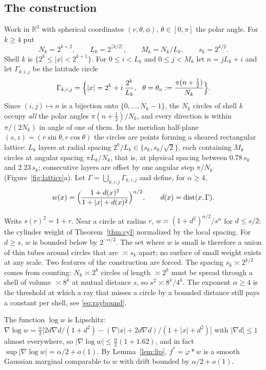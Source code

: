 \documentclass[11pt]{amsart}
\newcommand{\R}{\mathbb{R}}
\newcommand{\abs}[1]{\lvert #1\rvert}
\DeclareMathOperator{\dist}{dist}
\theoremstyle{plain}
\theoremstyle{definition}
\theoremstyle{remark}
\begin{document}
\subsection{The construction}\label{sec:construction}
Work in $\R^3$ with spherical coordinates $(r,\theta,\phi)$, $\theta\in[0,\pi]$
the polar angle. For $k\ge4$ put
\[
N_k=2^{k+2},\qquad L_k=2^{\lceil k/2\rceil},\qquad M_k=N_k/L_k,\qquad
s_k=2^{k/2}.
\]
Shell $k$ is $\{2^k\le\abs x<2^{k+1}\}$. For $0\le i<L_k$ and $0\le j<M_k$ let
$n=jL_k+i$ and let $\Gamma_{k,i,j}$ be the latitude circle
\[
\Gamma_{k,i,j}=\Bigl\{\abs x=2^k+i\,\frac{2^k}{L_k},\ \ \theta=\theta_n:=
\frac{\pi(n+\tfrac12)}{N_k}\Bigr\}.
\]
Since $(i,j)\mapsto n$ is a bijection onto $\{0,\dots,N_k-1\}$, the $N_k$
circles of shell $k$ occupy \emph{all} the polar angles $\pi(n+\frac12)/N_k$,
and every direction is within $\pi/(2N_k)$ in angle of one of them. In the
meridian half-plane $(s,z)=(r\sin\theta,r\cos\theta)$ the circles are points
forming a sheared rectangular lattice: $L_k$ layers at radial spacing
$2^k/L_k\in\{s_k,s_k/\sqrt2\}$, each containing $M_k$ circles at angular
spacing $\pi L_k/N_k$, that is, at physical spacing between $0.78\,s_k$ and
$2.23\,s_k$; consecutive layers are offset by one angular step $\pi/N_k$
(Figure~\ref{fig:lattice}a). Let $\Gamma=\bigcup_{k,i,j}\Gamma_{k,i,j}$ and
define, for $\alpha\ge4$,
\begin{equation}\label{eq:w}
w(x)=\Bigl(\frac{1+d(x)^2}{1+\abs x+d(x)^2}\Bigr)^{\alpha/2},\qquad
d(x)=\dist(x,\Gamma).
\end{equation}

Write $s(r)^2=1+r$. Near a circle at radius $r$, $w\asymp(1+d^2)^{\alpha/2}/s^\alpha$
for $d\le s/2$: the cylinder weight of Theorem~\ref{thm:cyl} normalized by the
local spacing. For $d\ge s$, $w$ is bounded below by $2^{-\alpha/2}$. The set
where $w$ is small is therefore a union of thin tubes around circles that are
$\asymp s_k$ apart; no surface of small weight exists at any scale. Two
features of the construction are forced. The spacing $s_k\asymp2^{k/2}$ comes
from counting: $N_k\asymp2^k$ circles of length $\asymp2^k$ must be spread
through a shell of volume $\asymp8^k$ at mutual distance $s$, so
$s^2\asymp8^k/4^k$. The exponent $\alpha\ge4$ is the threshold at which a ray
that misses a circle by a bounded distance still pays a constant per shell, see
\eqref{eq:raybound}.

The function $\log w$ is Lipschitz: $\nabla\log w=\frac{\alpha}{2}\bigl[
2d\nabla d/(1+d^2)-(\nabla\abs x+2d\nabla d)/(1+\abs x+d^2)\bigr]$ with
$\abs{\nabla d}\le1$ almost everywhere, so $\abs{\nabla\log w}\le
\frac{\alpha}{2}(1+1.62)$, and in fact $\sup\abs{\nabla\log w}=\alpha/2+o(1)$.
By Lemma~\ref{lem:lip}, $f^*=\varphi*w$ is a smooth Gaussian marginal comparable
to $w$ with drift bounded by $\alpha/2+o(1)$.
\end{document}
